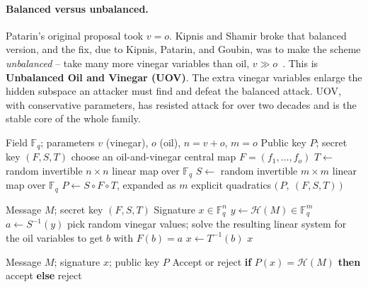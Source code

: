 \paragraph{Balanced versus unbalanced.}
Patarin's original proposal took $v = o$. Kipnis and Shamir broke that balanced version, and the fix, due to Kipnis, Patarin, and Goubin, was to make the scheme \emph{unbalanced} -- take many more vinegar variables than oil, $v \gg o$~\cite{kpg1999}. This is \textbf{Unbalanced Oil and Vinegar (UOV)}. The extra vinegar variables enlarge the hidden subspace an attacker must find and defeat the balanced attack. UOV, with conservative parameters, has resisted attack for over two decades and is the stable core of the whole family.

\begin{algorithm}[H]
\caption{UOV KeyGen (teaching form)}
\label{alg:uov-keygen}
\begin{algorithmic}[1]
\Require Field $\mathbb{F}_q$; parameters $v$ (vinegar), $o$ (oil), $n = v+o$, $m = o$
\Ensure Public key $P$; secret key $(F, S, T)$
\State choose an oil-and-vinegar central map $F = (f_1,\dots,f_o)$ 
\State $T \gets$ random invertible $n\times n$ linear map over $\mathbb{F}_q$ 
\State $S \gets$ random invertible $m\times m$ linear map over $\mathbb{F}_q$ 
\State $P \gets S \circ F \circ T$, expanded as $m$ explicit quadratics 
\State \Return $\big(\,P,\ (F, S, T)\,\big)$
\end{algorithmic}
\end{algorithm}

\begin{algorithm}[H]
\caption{UOV Sign (teaching form)}
\label{alg:uov-sign}
\begin{algorithmic}[1]
\Require Message $M$; secret key $(F, S, T)$
\Ensure Signature $x \in \mathbb{F}_q^n$
\State $y \gets \mathcal{H}(M) \in \mathbb{F}_q^m$ 
\State $a \gets S^{-1}(y)$ 
\State pick random vinegar values; solve the resulting linear system for the oil variables to get $b$ with $F(b) = a$ 
\State $x \gets T^{-1}(b)$ 
\State \Return $x$
\end{algorithmic}
\end{algorithm}

\begin{algorithm}[H]
\caption{UOV Verify (teaching form)}
\label{alg:uov-verify}
\begin{algorithmic}[1]
\Require Message $M$; signature $x$; public key $P$
\Ensure Accept or reject
\State \textbf{if} $P(x) = \mathcal{H}(M)$ \textbf{then} \Return accept \textbf{else} \Return reject 
\end{algorithmic}
\end{algorithm}

